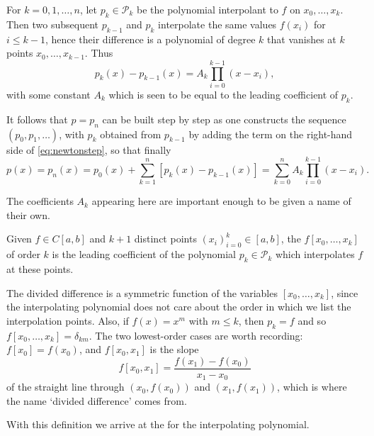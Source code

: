 \begin{method}
For $k=0,1, \ldots, n$, let $p_{k} \in \mathcal{P}_{k}$ be the polynomial interpolant to $f$ on $x_{0}, \ldots, x_{k}$. Then two subsequent $p_{k-1}$ and $p_{k}$ interpolate the same values $f\left(x_{i}\right)$ for $i \leq k-1$, hence their difference is a polynomial of degree $k$ that vanishes at $k$ points $x_{0}, \ldots, x_{k-1}$. Thus
\begin{equation}\label{eq:newtonstep}
p_{k}(x)-p_{k-1}(x)=A_{k} \prod_{i=0}^{k-1}\left(x-x_{i}\right),
\end{equation}
with some constant $A_{k}$ which is seen to be equal to the leading coefficient of $p_{k}$.

It follows that $p=p_{n}$ can be built step by step as one constructs the sequence $\left(p_{0}, p_{1}, \ldots\right)$, with $p_{k}$ obtained from $p_{k-1}$ by adding the term on the right-hand side of \eqref{eq:newtonstep}, so that finally
$$
p(x)=p_{n}(x)=p_{0}(x)+\sum_{k=1}^{n}\left[p_{k}(x)-p_{k-1}(x)\right]=\sum_{k=0}^{n} A_{k} \prod_{i=0}^{k-1}\left(x-x_{i}\right).
$$
\end{method}

The coefficients $A_k$ appearing here are important enough to be given a name of their own.

\begin{definition}
Given $f \in C[a, b]$ and $k+1$ distinct points $\left(x_{i}\right)_{i=0}^{k} \in[a, b]$, the  $f\left[x_{0}, \ldots, x_{k}\right]$ of order $k$ is the leading coefficient of the polynomial $p_{k} \in \mathcal{P}_{k}$ which interpolates $f$ at these points.
\end{definition}

The divided difference is a symmetric function of the variables $\left[x_{0}, \ldots, x_{k}\right]$, since the interpolating polynomial does not care about the order in which we list the interpolation points. Also, if $f(x)=x^{m}$ with $m \leq k$, then $p_k = f$ and so $f\left[x_{0}, \ldots, x_{k}\right]=\delta_{k m}$. The two lowest-order cases are worth recording: $f[x_0] = f(x_0)$, and $f[x_0, x_1]$ is the slope
$$
f[x_0, x_1] = \frac{f(x_1) - f(x_0)}{x_1 - x_0}
$$
of the straight line through $(x_0, f(x_0))$ and $(x_1, f(x_1))$, which is where the name `divided difference' comes from.

With this definition we arrive at the  for the interpolating polynomial.


